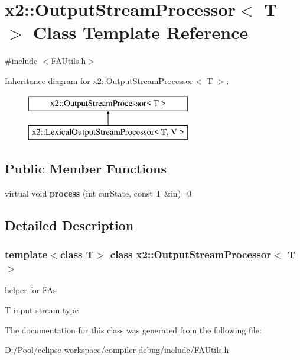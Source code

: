 \hypertarget{classx2_1_1_output_stream_processor}{}\section{x2\+:\+:Output\+Stream\+Processor$<$ T $>$ Class Template Reference}
\label{classx2_1_1_output_stream_processor}


{\ttfamily \#include $<$F\+A\+Utils.\+h$>$}

Inheritance diagram for x2\+:\+:Output\+Stream\+Processor$<$ T $>$\+:\begin{figure}[H]
\begin{center}
\leavevmode
\includegraphics[height=2.000000cm]{classx2_1_1_output_stream_processor}
\end{center}
\end{figure}
\subsection*{Public Member Functions}
\begin{DoxyCompactItemize}
\item 
\mbox{\label{classx2_1_1_output_stream_processor_af3cc85a55c0029e301aa2c9bcd80dcb8}} 
virtual void {\bfseries process} (int cur\+State, const T \&in)=0
\end{DoxyCompactItemize}


\subsection{Detailed Description}
\subsubsection*{template$<$class T$>$\newline
class x2\+::\+Output\+Stream\+Processor$<$ T $>$}

helper for F\+As

T input stream type 

The documentation for this class was generated from the following file\+:\begin{DoxyCompactItemize}
\item 
D\+:/\+Pool/eclipse-\/workspace/compiler-\/debug/include/F\+A\+Utils.\+h\end{DoxyCompactItemize}
